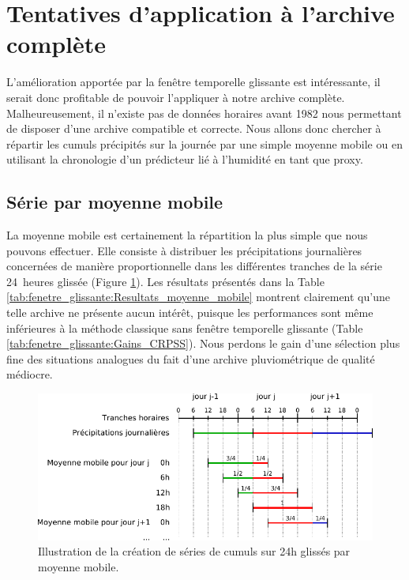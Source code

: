 \documentclass[hess]{copernicus}
\begin{document}
\section{Tentatives d'application à l'archive complète}

L'amélioration apportée par la fenêtre temporelle glissante est intéressante, il serait donc profitable de pouvoir l'appliquer à notre archive complète. Malheureusement, il n'existe pas de données horaires avant 1982 nous permettant de disposer d'une archive compatible et correcte. Nous allons donc chercher à répartir les cumuls précipités sur la journée par une simple moyenne mobile ou en utilisant la chronologie d'un prédicteur lié à l'humidité en tant que proxy.

\subsection{Série par moyenne mobile}

La moyenne mobile est certainement la répartition la plus simple que nous pouvons effectuer. Elle consiste à distribuer les précipitations journalières concernées de manière proportionnelle dans les différentes tranches de la série 24~heures glissée (Figure \ref{fig:illustration_disaggregation}). Les résultats présentés dans la Table \ref{tab:fenetre_glissante:Resultats_moyenne_mobile} montrent clairement qu'une telle archive ne présente aucun intérêt, puisque les performances sont même inférieures à la méthode classique sans fenêtre temporelle glissante (Table \ref{tab:fenetre_glissante:Gains_CRPSS}). Nous perdons le gain d'une sélection plus fine des situations analogues du fait d'une archive pluviométrique de qualité médiocre.

\begin{figure}[htb]
	\begin{center}
		\includegraphics[width=12cm]{figures/illustration_disaggregation.pdf}
	\end{center}
	\caption{Illustration de la création de séries de cumuls sur 24h glissés par moyenne mobile.}
	\label{fig:illustration_disaggregation}
\end{figure}
\end{document}
